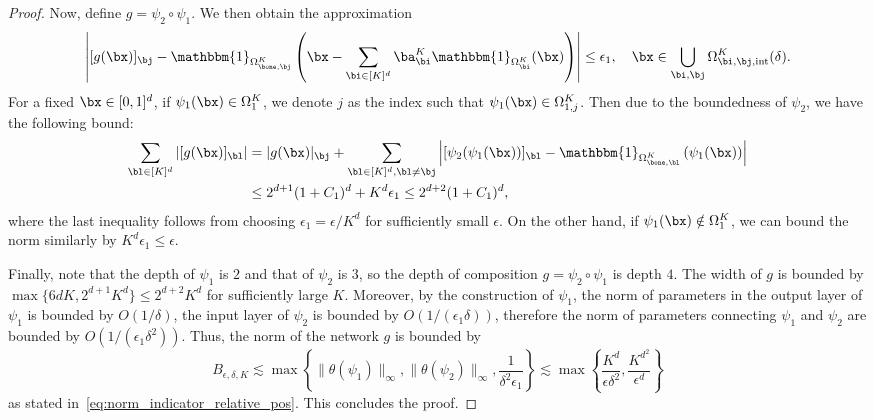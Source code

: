 \documentclass[11pt]{article}
\begin{document}
\begin{proof}
    
    Now, define $g = \psi_2 \circ \psi_1$. We then obtain the approximation
    \begin{equation*}
        \left|  [g(\bx)]_{\bj} - \mathbbm{1}_{\Omega_{\bone, \bj}^{K}} \left(\bx - \sum_{\bi \in [K]^d} \ba_{\bi}^K  \mathbbm{1}_{\Omega_{\bi}^K}(\bx)\right)  \right| \leq \epsilon_1, \quad \bx \in \bigcup_{\bi, \bj} \Omega_{\bi, \bj, \mathrm{int}}^K(\delta).
    \end{equation*}
    For a fixed $\bx \in [0,1]^d$, if $\psi_1(\bx) \in \Omega_1^K$, we denote $j$ as the index such that $\psi_1(\bx) \in \Omega_{1,j}^K$. Then due to the boundedness of $\psi_2$, we have the following bound:
    \begin{equation*}
        \begin{aligned}
            \sum_{\bl \in [K]^d} \left| [g(\bx)]_{\bl} \right| & = |g(\bx)|_{\bj} + \sum_{\bl \in [K]^d, \bl \neq \bj} \left|  [\psi_2(\psi_1(\bx))]_{\bl} - \mathbbm{1}_{\Omega_{\bone, \bl}^{K}} \left (\psi_1(\bx) \right) 
            \right| \\
            & \leq 2^{d+1}(1+C_1)^d + K^d \epsilon_1 \leq 2^{d+2}(1+C_1)^d,
        \end{aligned}
    \end{equation*}
    where the last inequality follows from choosing $\epsilon_1 = \epsilon / K^d$ for sufficiently small $\epsilon$. On the other hand, if $\psi_1(\bx) \notin \Omega_1^K$, we can bound the norm similarly by $K^d \epsilon_1 \leq \epsilon$.


    Finally, note that the depth of $\psi_1$ is $2$ and that of $\psi_2$ is $3$, so the depth of composition $g = \psi_2 \circ \psi_1$ is depth $4$. The width of $g$ is bounded by $\max\{6 d K, 2^{d+1} K^d \} \leq 2^{d+2} K^d$ for sufficiently large $K$. Moreover, by the construction of $\psi_1$, the norm of parameters in the output layer of $\psi_1$ is bounded by $O(1/\delta)$, the input layer of $\psi_2$ is bounded by $O(1/(\epsilon_1 \delta))$, therefore the norm of parameters connecting $\psi_1$ and $\psi_2$ are bounded by $O(1/(\epsilon_1 \delta^2))$. Thus, the norm of the network $g$ is bounded by 
    \begin{equation*}
        B_{\epsilon, \delta, K} \lesssim \max \left\{ \|\theta(\psi_1)\|_{\infty}, \|\theta(\psi_2)\|_{\infty}, \frac{1}{\delta^2 \epsilon_1}\right\} \lesssim \max \left\{ \frac{K^d}{\epsilon \delta^2}, \frac{K^{d^2}}{\epsilon^d} \right\}
    \end{equation*}
    as stated in~\eqref{eq:norm_indicator_relative_pos}. This concludes the proof. 
\end{proof}
\end{document}

